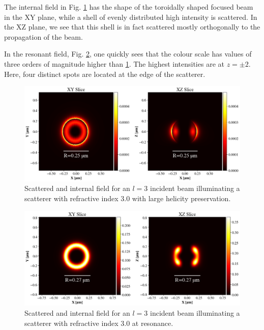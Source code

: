 The internal field in Fig. \ref{fig:scatfig1} has the shape of the toroidally shaped focused beam in the XY plane, while a shell of evenly distributed high intensity is scattered. In the XZ plane, we see that this shell is in fact scattered mostly orthogonally to the propagation of the beam.

In the resonant field, Fig. \ref{fig:scatfig2}, one quickly sees that the colour scale has values of three orders of magnitude higher than \ref{fig:scatfig1}. The highest intensities are at \( z = \pm 2 \). Here, four distinct spots are located at the edge of the scatterer.

\begin{figure}
    \includegraphics[width=\textwidth]{Figures/scat_pres_l3.png}
    \caption{Scattered and internal field for an \( l = 3 \) incident beam illuminating a scatterer with refractive index \( 3.0 \) with large helicity preservation.}
    \label{fig:scatfig1}
\end{figure}

\begin{figure}
    \includegraphics[width=\textwidth]{Figures/scat_res_l3.png}
    \caption{Scattered and internal field for an \( l = 3 \) incident beam illuminating a scatterer with refractive index \( 3.0 \) at resonance.}
    \label{fig:scatfig2}
\end{figure}